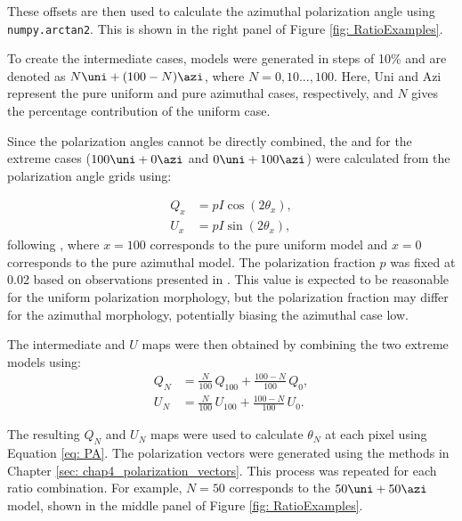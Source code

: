 \noindent These offsets are then used to calculate the azimuthal polarization angle using \texttt{numpy.arctan2}. This is shown in the right panel of Figure \ref{fig: RatioExamples}.



To create the intermediate cases, models were generated in steps of 10\% and are denoted as $N \uni + (100 - N) \azi$, where $N = 0, 10 \ldots, 100$. Here, Uni and Azi represent the pure uniform and pure azimuthal cases, respectively, and $N$ gives the percentage contribution of the uniform case. 

Since the polarization angles cannot be directly combined, the \SQ and \SU for the extreme cases ($100\uni+0\azi$ and $0\uni+100\azi$) were calculated from the polarization angle grids using:

\begin{equation}
\begin{aligned}
Q_x
    &= p I \cos(2\theta_x),
     \\
U_x
    &=  p I \sin(2\theta_x) ,
\end{aligned}
\end{equation}
\noindent following \cite{Montier}, where $x= 100$ corresponds to the pure uniform model and $x=0$ corresponds to the pure azimuthal model. The polarization fraction $p$ was fixed at 0.02 based on observations presented in \cite{sadavoy_dust_2019}. This value is expected to be reasonable for the uniform polarization morphology, but the polarization fraction may differ for the azimuthal morphology, potentially biasing the azimuthal case low.




The intermediate \SQ and $U$ maps were then obtained by combining the two extreme models using:
\begin{equation}
\begin{aligned}
Q_{N}
    &= \frac{N}{100}\,Q_{100}
     + \frac{100 -N}{100}\,Q_0, \\
U_{N}
    &= \frac{N}{100}\,U_{100}
     + \frac{100 -N}{100}\,U_0.
\end{aligned}
\end{equation}

\noindent The resulting $Q_N$ and $U_N$ maps were used to calculate $\theta_N$ at each pixel using Equation \ref{eq: PA}. The polarization vectors were generated using the methods in Chapter \ref{sec: chap4_polarization_vectors}. This process was repeated for each ratio combination. For example, $N=50$ corresponds to the $50\uni+50\azi$ model, shown in the middle panel of Figure \ref{fig: RatioExamples}.






